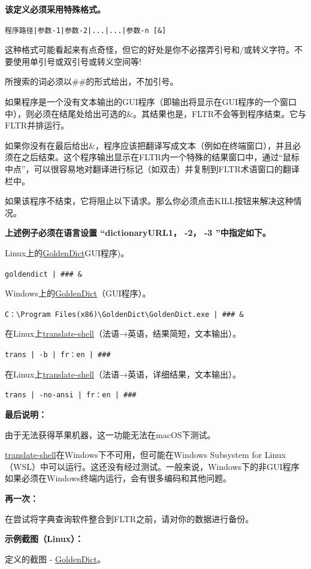 \documentclass[cn,10pt,math=newtx,citestyle=gb7714-2015,bibstyle=gb7714-2015]{elegantbook}
\newcommand{\goldendict}{\href{http://goldendict.org/}{GoldenDict}}
\newcommand{\translateshell}{\href{https://github.com/soimort/translate-shell}{translate-shell}}
\begin{document}
\textbf{该定义必须采用特殊格式。}

\lstinline{程序路径|参数-1|参数-2|...|...|参数-n [&]}



这种格式可能看起来有点奇怪，但它的好处是你不必摆弄引号和/或转义字符。不要使用单引号或双引号或转义空间等!

所搜索的词必须以\#\#的形式给出，不加引号。

如果程序是一个没有文本输出的GUI程序（即输出将显示在GUI程序的一个窗口中），则必须在结尾处给出可选的\&。其结果也是，FLTR不会等到程序结束。它与FLTR并排运行。

如果你没有在最后给出\&，程序应该把翻译写成文本（例如在终端窗口），并且必须在之后结束。这个程序输出显示在FLTR内一个特殊的结果窗口中，通过“鼠标中点”，可以很容易地对翻译进行标记（如双击）并复制到FLTR术语窗口的翻译栏中。

如果该程序不结束，它将阻止以下请求。那么你必须点击KILL按钮来解决这种情况。


\textbf{上述例子必须在语言设置 “dictionaryURL1， -2， -3 ”中指定如下。}

Linux上的\goldendict GUI程序)。

\lstinline{goldendict | ### &}

Windows上的\goldendict （GUI程序）。

\lstinline{C：\Program Files(x86)\GoldenDict\GoldenDict.exe | ### &}

在Linux上\translateshell（法语→英语，结果简短，文本输出）。

\lstinline{trans | -b | fr：en | ###}

在Linux上\translateshell（法语→英语，详细结果，文本输出）。

\lstinline{trans | -no-ansi | fr：en | ###}

\textbf{最后说明：}

由于无法获得苹果机器，这一功能无法在macOS下测试。

\translateshell 在Windows下不可用，但可能在Windows Subsystem for Linux（WSL）中可以运行。这还没有经过测试。一般来说，Windows下的非GUI程序如果必须在Windows终端内运行，会有很多编码和其他问题。

\textbf{再一次：}


在尝试将字典查询软件整合到FLTR之前，请对你的数据进行备份。


\textbf{示例截图（Linux）：}

定义的截图 - \goldendict 。
\end{document}
